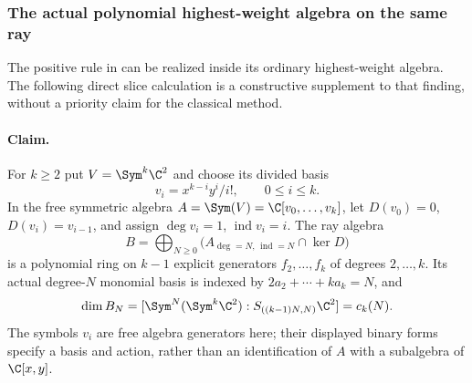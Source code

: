 \subsubsection{The actual polynomial highest-weight algebra on the same ray}
The positive rule in  can be realized inside its ordinary
highest-weight algebra. The following direct slice calculation is a
constructive supplement to that finding, without a priority claim for
the classical method.

\paragraph{Claim.}
For $k\ge2$ put $V=\Sym^k\C^2$ and choose its divided basis
\[
 v_i=x^{k-i}y^i/i!,\qquad 0\le i\le k.
\]
In the free symmetric algebra $A=\Sym(V)=\C[v_0,\ldots,v_k]$,
let $D(v_0)=0$, $D(v_i)=v_{i-1}$, and assign
$\deg v_i=1$, $\operatorname{ind}v_i=i$.
The ray algebra
\[
 B=\bigoplus_{N\ge0}
       \bigl(A_{\deg=N,\,\operatorname{ind}=N}\cap\ker D\bigr)
\]
is a polynomial ring on $k-1$ explicit generators $f_2,\ldots,f_k$
of degrees $2,\ldots,k$. Its actual degree-$N$ monomial basis is
indexed by $2a_2+\cdots+ka_k=N$, and
\[
 \dim B_N=[\Sym^N(\Sym^k\C^2):S_{((k-1)N,N)}\C^2]=c_k(N).
\]
The symbols $v_i$ are free algebra generators here; their displayed
binary forms specify a basis and action, rather than an identification
of $A$ with a subalgebra of $\C[x,y]$.

